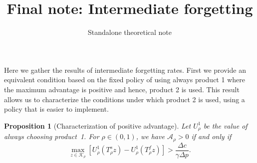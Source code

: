 \documentclass[11pt]{article}
\title{Final note: Intermediate forgetting}
\author{Standalone theoretical note}
\date{}
\newtheorem{proposition}{Proposition}
\begin{document}
\maketitle

Here we gather the results of intermediate forgetting rates. First we provide an equivalent condition based on the fixed policy of using always product 1 where the maximum advantage is positive and hence, product 2 is used. This result allows us to characterize the conditions under which product 2 is used, using a policy that is easier to implement. 


\begin{proposition}[Characterization of positive advantage]
\label{prop:positive-characterization}
Let $U^{1}_\rho$ be the value of always choosing product~1.
For $\rho\in(0,1)$, we have $\mathcal A_\rho>0$ if and only if
\begin{equation}
\max_{z\in\mathcal K_\rho}
\left[U_\rho^1(T_\rho^s z)-U_\rho^1(T_\rho^f z)\right]
>\frac{\Delta c}{\gamma\Delta p}.
\end{equation}
\end{proposition}
\end{document}
